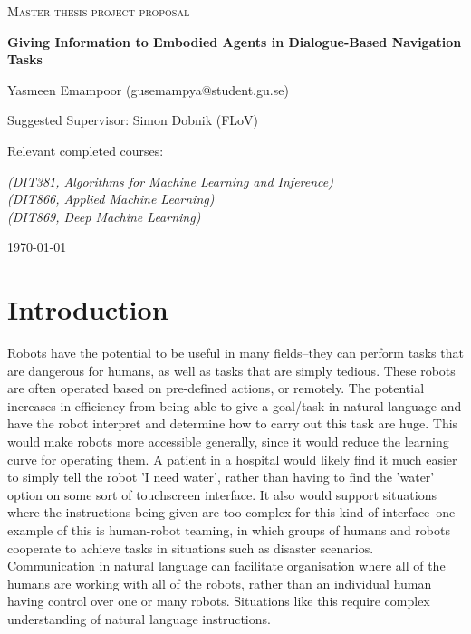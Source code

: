 \documentclass{article}
\begin{document}
\begin{titlepage}
  

\centering
  
  
{\scshape\LARGE Master thesis project proposal\\}
  
\vspace{0.5cm}
  
{\huge\bfseries Giving Information to Embodied Agents in Dialogue-Based Navigation Tasks\\}
  
\vspace{2cm}
  
{\Large Yasmeen Emampoor (gusemampya@student.gu.se)\\}
  
\vspace{1.0cm}
  
{\large Suggested Supervisor: Simon Dobnik (FLoV)\\}
  
\vspace{1.5cm}
  
  
{\large Relevant completed courses:\par}
{\itshape (DIT381, Algorithms for Machine Learning and Inference)\\ (DIT866, Applied Machine Learning) \\ (DIT869, Deep Machine Learning)}
  
\vspace{1.5cm}
  
\vfill

\vfill
  
{\large \today\\} 


\end{titlepage}
\section{Introduction}
Robots have the potential to be useful in many fields–they can perform tasks
that are dangerous for humans, as well as tasks that are simply tedious. These
robots are often operated based on pre-defined actions, or remotely. The potential increases in efficiency from being able to give a goal/task in natural language and have the robot interpret and determine how to carry out this task are huge.
This would make robots more accessible generally, since it would reduce the
learning curve for operating them. A patient in a hospital would likely find it much easier to simply tell the robot 'I need water', rather than having to find the 'water' option on some sort of touchscreen interface. It also would support situations where the instructions being given are too complex for this kind of interface--one example of this is human-robot teaming, in which groups of humans and robots cooperate to achieve tasks in situations such as disaster scenarios\cite{Kruijff-Korbayova:2015aa}. Communication in natural language can facilitate organisation where all of the humans are working with all of the robots, rather than an individual human having control over one or many robots. Situations like this require complex understanding of natural language instructions. 
\end{document}
